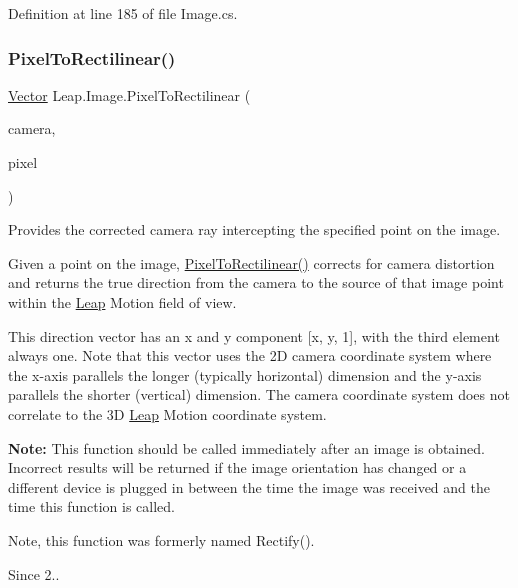 Definition at line 185 of file Image.\+cs.

\mbox{\label{class_leap_1_1_image_a8fd5b7f8e734a2b7232ac7b315828987}} 
\subsubsection{\texorpdfstring{PixelToRectilinear()}{PixelToRectilinear()}}
{\footnotesize\ttfamily \mbox{\hyperlink{struct_leap_1_1_vector}{Vector}} Leap.\+Image.\+Pixel\+To\+Rectilinear (\begin{DoxyParamCaption}\item[{\mbox{\hyperlink{class_leap_1_1_image_a28310e43e0f2d7f7117e1b45330bdc38}{Camera\+Type}}}]{camera,  }\item[{\mbox{\hyperlink{struct_leap_1_1_vector}{Vector}}}]{pixel }\end{DoxyParamCaption})}



Provides the corrected camera ray intercepting the specified point on the image. 

Given a point on the image, \mbox{\hyperlink{class_leap_1_1_image_a8fd5b7f8e734a2b7232ac7b315828987}{Pixel\+To\+Rectilinear()}} corrects for camera distortion and returns the true direction from the camera to the source of that image point within the \mbox{\hyperlink{namespace_leap}{Leap}} Motion field of view.

This direction vector has an x and y component \mbox{[}x, y, 1\mbox{]}, with the third element always one. Note that this vector uses the 2D camera coordinate system where the x-\/axis parallels the longer (typically horizontal) dimension and the y-\/axis parallels the shorter (vertical) dimension. The camera coordinate system does not correlate to the 3D \mbox{\hyperlink{namespace_leap}{Leap}} Motion coordinate system.

{\bfseries{Note\+:}} This function should be called immediately after an image is obtained. Incorrect results will be returned if the image orientation has changed or a different device is plugged in between the time the image was received and the time this function is called.

Note, this function was formerly named Rectify(). \begin{DoxySince}{Since}
2.. 
\end{DoxySince}



